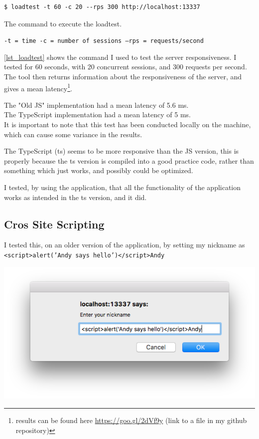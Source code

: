 \documentclass[a4paper]{article}
\begin{document}
\begin{listing}[H]
\centering
\begin{verbatim}
$ loadtest -t 60 -c 20 --rps 300 http://localhost:13337
\end{verbatim}
\caption{The command to execute the loadtest.}
\label{lst_loadtest}
\texttt{-t = time   -c = number of sessions  --rps = requests/second}
\end{listing}

\autoref{lst_loadtest} shows the command I used to test the server responsiveness. I tested for 60 seconds, with 20 concurrent sessions, and 300 requests per second.\\

The tool then returns information about the responsiveness of the server, and gives a mean latency\footnote{ results can be found here \url{https://goo.gl/2dVf9y} (link to a file in my github repository)}.

The "Old JS" implementation had a mean latency of 5.6 ms.\\
The TypeScript implementation had a mean latency of 5 ms.\\

It is important to note that this test has been conducted locally on the machine, which can cause some variance in the results.

The TypeScript (ts) seems to be more responsive than the JS version, this is properly because the ts version is compiled into a good practice code, rather than something which just works, and possibly could be optimized.

I tested, by using the application, that all the functionality of the application works as intended in the ts version, and it did.


\subsection{Cros Site Scripting}
I tested this, on an older version of the application, by setting my nickname as \texttt{<script>alert('Andy says hello')</script>Andy}

\begin{center}
	\includegraphics[width=.5\textwidth]{images/xss_input}
\end{center}
\end{document}
